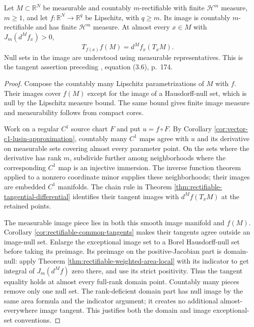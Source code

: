 \begin{lemma}\label{lem:rectifiable-full-rank-image-tangent}
Let $M\subset\mathbb R^N$ be measurable and countably $m$-rectifiable with finite $\mathcal H^m$ measure, $m\geq1$, and let $f:\mathbb R^N\to\mathbb R^q$ be Lipschitz, with $q\geq m$. Its image is countably $m$-rectifiable and has finite $\mathcal H^m$ measure. At almost every $x\in M$ with $J_m(d^Mf_x)>0$,
\[
 T_{f(x)}f(M)=d^Mf_x(T_xM).
\]
Null sets in the image are understood using measurable representatives. This is the tangent assertion preceding \cite{Sim18}, equation (3.6), p.~174.
\end{lemma}
\begin{proof}
Compose the countably many Lipschitz parametrizations of $M$ with $f$. Their images cover $f(M)$ except for the image of a Hausdorff-null set, which is null by the Lipschitz measure bound. The same bound gives finite image measure and measurability follows from compact cores.

Work on a regular $C^1$ source chart $F$ and put $u=f\circ F$. By Corollary \ref{cor:vector-c1-lusin-approximation}, countably many $C^1$ maps agree with $u$ and its derivative on measurable sets covering almost every parameter point. On the sets where the derivative has rank $m$, subdivide further among neighborhoods where the corresponding $C^1$ map is an injective immersion. The inverse function theorem applied to a nonzero coordinate minor supplies these neighborhoods; their images are embedded $C^1$ manifolds. The chain rule in Theorem \ref{thm:rectifiable-tangential-differential} identifies their tangent images with $d^Mf(T_xM)$ at the retained points.

The measurable image piece lies in both this smooth image manifold and $f(M)$. Corollary \ref{cor:rectifiable-common-tangents} makes their tangents agree outside an image-null set. Enlarge the exceptional image set to a Borel Hausdorff-null set before taking its preimage. Its preimage on the positive-Jacobian part is domain-null: apply Theorem \ref{thm:rectifiable-weighted-area-local} with its indicator to get integral of $J_m(d^Mf)$ zero there, and use its strict positivity. Thus the tangent equality holds at almost every full-rank domain point. Countably many pieces remove only one null set. The rank-deficient domain part has null image by the same area formula and the indicator argument; it creates no additional almost-everywhere image tangent. This justifies both the domain and image exceptional-set conventions.
\end{proof}

